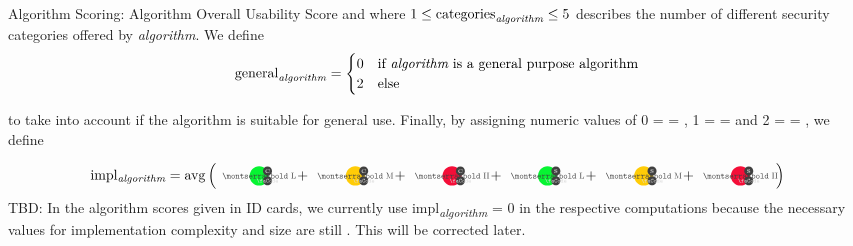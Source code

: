 \documentclass[11pt,english,a4paper, landscape]{scrartcl}
\begin{document}
\begin{algorithmbox}{Algorithm Scoring: Algorithm Overall Usability Score}
		and where $1\leq\textnormal{categories}_\textnormal{\itshape algorithm}\leq 5$ describes the number of different security categories offered by {\itshape algorithm}. We define
		\begin{align*}
			\textnormal{general}_\textnormal{\itshape algorithm} = \begin{cases}
			0 & \textnormal{if {\itshape algorithm} is a general purpose algorithm} \\
			2 & \textnormal{else}
			\end{cases}
		\end{align*}

	to take into account if the algorithm is suitable for general use. Finally, by assigning numeric values of 0 = \hspace{-2mm}= \hspace{-2mm}, 1 = \hspace{-2mm}= \hspace{-2mm} and 2 = \hspace{-2mm}= \hspace{-2mm}, we define

	\begin{align*}
		\textnormal{impl\textsubscript{\itshape algorithm}} = \avg\left({\scriptsize
		\tripleicon{\montserratbold L}{\faCode}{themegreen}{0.6}{\bfseries C}\hspace{-2mm} +
		\tripleicon{\montserratbold M}{\faCode}{themeyellow}{0.6}{\bfseries C}\hspace{-2mm} +
		\tripleicon{\montserratbold H}{\faCode}{themered}{0.6}{\bfseries C}\hspace{-2mm} +
		\tripleicon{\montserratbold L}{\faCode}{themegreen}{0.6}{\bfseries S}\hspace{-2mm} +
		\tripleicon{\montserratbold M}{\faCode}{themeyellow}{0.6}{\bfseries S}\hspace{-2mm} +
		\tripleicon{\montserratbold H}{\faCode}{themered}{0.6}{\bfseries S}\hspace{-2mm}
		}\right)
	\end{align*}
	\textcolor{themeaccentsecondary}{TBD: In the algorithm scores given in ID cards, we currently use \textnormal{impl\textsubscript{\itshape algorithm}} = 0 in the respective computations because the necessary values for implementation complexity and size are still \tbd. This will be corrected later.}
   \end{algorithmbox}
\end{document}
